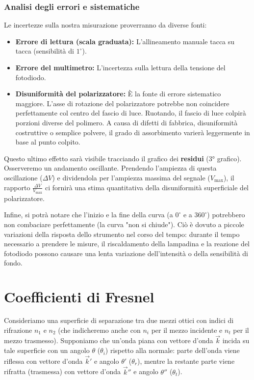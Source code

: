 \documentclass[openany,a4paper,12pt]{book}
\begin{document}
\subsubsection*{Analisi degli errori e sistematiche}
Le incertezze sulla nostra misurazione proverranno da diverse fonti:
\begin{itemize}
    \item \textbf{Errore di lettura (scala graduata):} L'allineamento manuale tacca su tacca (sensibilità di $1^\circ$).
    \item \textbf{Errore del multimetro:} L'incertezza sulla lettura della tensione del fotodiodo.
    \item \textbf{Disuniformità del polarizzatore:} È la fonte di errore sistematico maggiore. L'asse di rotazione del polarizzatore potrebbe non coincidere perfettamente col centro del fascio di luce. Ruotando, il fascio di luce colpirà porzioni diverse del polimero. A causa di difetti di fabbrica, disuniformità costruttive o semplice polvere, il grado di assorbimento varierà leggermente in base al punto colpito.
\end{itemize}

Questo ultimo effetto sarà visibile tracciando il grafico dei \textbf{residui} (3° grafico). Osserveremo un andamento oscillante.
Prendendo l'ampiezza di questa oscillazione ($\Delta V$) e dividendola per l'ampiezza massima del segnale ($V_{\text{max}}$), il rapporto $\frac{\Delta V}{V_{\text{max}}}$ ci fornirà una stima quantitativa della disuniformità superficiale del polarizzatore.

Infine, si potrà notare che l'inizio e la fine della curva (a $0^\circ$ e a $360^\circ$) potrebbero non combaciare perfettamente (la curva "non si chiude"). Ciò è dovuto a piccole variazioni della risposta dello strumento nel corso del tempo: durante il tempo necessario a prendere le misure, il riscaldamento della lampadina e la reazione del fotodiodo possono causare una lenta variazione dell'intensità o della sensibilità di fondo.






\section{Coefficienti di Fresnel}

Consideriamo una superficie di separazione tra due mezzi ottici con indici di rifrazione $n_1$ e $n_2$ (che indicheremo anche con $n_i$ per il mezzo incidente e $n_t$ per il mezzo trasmesso).
Supponiamo che un'onda piana con vettore d'onda $\vec{k}$ incida su tale superficie con un angolo $\theta$ ($\theta_i$) rispetto alla normale: parte dell'onda viene riflessa con vettore d'onda $\vec{k}'$ e angolo $\theta'$ ($\theta_r$), mentre la restante parte viene rifratta (trasmessa) con vettore d'onda $\vec{k}''$ e angolo $\theta''$ ($\theta_t$).
\end{document}
